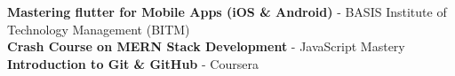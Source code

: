 

 \textbf{Mastering flutter for Mobile Apps (iOS \& Android)} - BASIS Institute of Technology Management (BITM) \\
 \vspace{1mm}
 \textbf{Crash Course on MERN Stack Development} - JavaScript Mastery \\
 \vspace{1mm}
 \textbf{Introduction to Git \& GitHub } - Coursera \\
